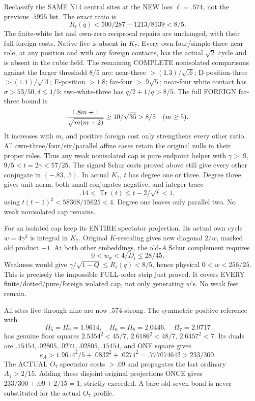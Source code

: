 Reclassify the SAME N14 central sites at the
NEW loss \(\ell=.574\), not the previous
\(.5995\) list.
The exact ratio is
\[
 R_\ell(q)<500/287-1213/8139<8/5 .
\]
The finite-white list and own-zero reciprocal
repairs are unchanged, with their full foreign
costs.
Native five is absent in \(K_7\).
Every own-four/simple-three near role, at
any position and with any foreign contacts,
has the actual \(\sqrt2\) cycle and is absent
in the cubic field.
The remaining COMPLETE nonisolated comparisons
against the larger threshold \(8/5\) are:
near-three \(>(1.3)/\sqrt{.6}\);
D-position-three \(>(1.1)/\sqrt{.4}\);
E-position \(>1.8\);
far-four \(>.9\sqrt5\);
near-four white contact has
\(\sigma>53/50,\delta\le1/5\);
two-white-three has \(q/2+1/q>8/5\).
The full FOREIGN far-three bound is
\[
                {1.8m+1\over\sqrt{m(m+2)}}\ge10/\sqrt{35}>8/5
                    \quad(m\ge5).
\]
It increases with \(m\), and positive foreign
cost only strengthens every other ratio.
All own-three/four/six/parallel affine cases
retain the original nulls in their proper roles.
Thus any weak nonisolated cap is pure endpoint
helper with \(\gamma>.9\),
\(9/5<t=2\gamma<57/25\).
The signed Schur costs proved above still give
every other conjugate in \((-.83,.5)\).
In actual \(K_7\), \(t\) has degree one or three.
Degree three gives unit norm, both small
conjugates negative, and integer trace
\[
                      .14<\operatorname{Tr}(t)
                              \le t-2/\sqrt t<1,
\]
using \(t(t-1)^2<58368/15625<4\).
Degree one leaves only parallel two.
No weak nonisolated cap remains.

For an isolated cap keep its ENTIRE spectator
projection.
Its actual own cycle \(w=4\gamma^2\) is integral
in \(K_7\).
Original \(K\)-rescaling gives new diagonal
\(2/w\), marked old product \(-1\).
At both other embeddings, the old-\(A\)
Schur complement requires
\[
                       0<w_\sigma<4/D_i\le28/45 .
\]
Weakness would give
\(\gamma/\sqrt{1-Q}\le R_\ell(q)<8/5\),
hence physical \(0<w<256/25\).
This is precisely the impossible FULL-order
strip just proved.
It covers EVERY finite/dotted/pure/foreign
isolated cap, not only generating \(w\)'s.
No weak feet remain.

All sites five through nine are now
\(.574\)-strong.
The symmetric positive reference with
\[
 H_5=H_9=1.9614,\quad H_6=H_8=2.0446,\quad H_7=2.0717
\]
has genuine floor squares
\(2.5354^2<45/7\), \(2.6186^2<48/7\),
\(2.6457^2<7\).
Its duals are
\(.15454,.02805,.0271,.02805,.15454\),
and ONE square gives
\[
 e_A>1.9614^2/5+.0832^2+.0271^2
                         =.777074642>233/300 .
\]
The ACTUAL \(O_7\) spectator costs \(>.09\)
and propagates the last ordinary \(A_1>2/15\).
Adding these disjoint original projections
ONCE gives \(233/300+.09+2/15=1\), strictly
exceeded.
A bare old seven bond is never substituted
for the actual \(O_7\) profile.

